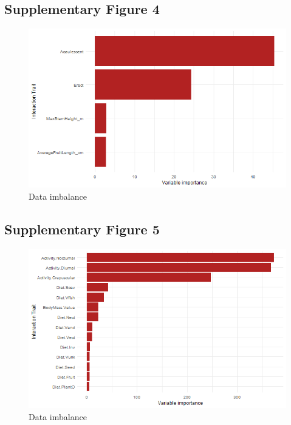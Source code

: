 \documentclass[
]{agujournal2019}
\begin{document}
\subsection{Supplementary Figure 4}

\begin{figure}[H]

{\centering \includegraphics[width=5.67708in,height=\textheight]{sup_figures/palm_var_imp.jpg}

}

\caption{Data imbalance}

\end{figure}%

\subsection{Supplementary Figure 5}

\begin{figure}[H]

{\centering \includegraphics[width=5.67708in,height=\textheight]{sup_figures/mammal_var_imp.jpg}

}

\caption{Data imbalance}

\end{figure}%
\end{document}
